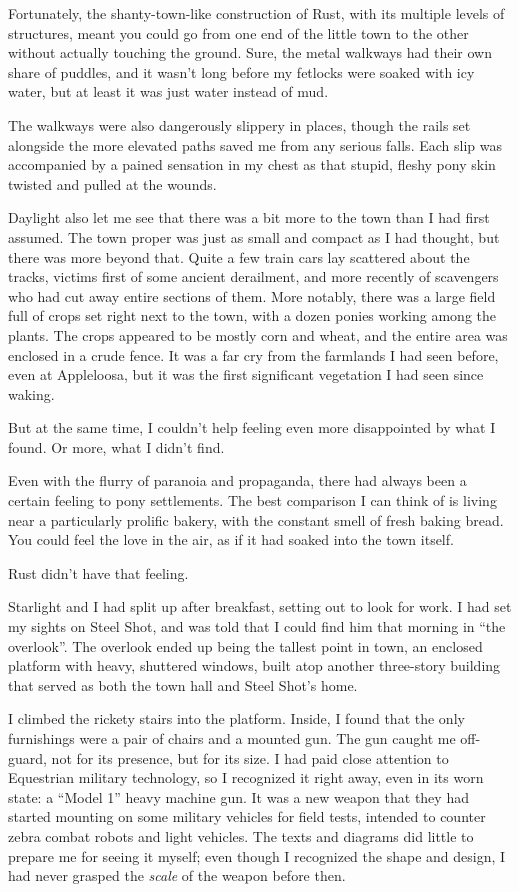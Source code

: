 Fortunately, the shanty-town-like construction of Rust, with its multiple levels of structures, meant you could go from one end of the little town to the other without actually touching the ground. Sure, the metal walkways had their own share of puddles, and it wasn’t long before my fetlocks were soaked with icy water, but at least it was just water instead of mud.

The walkways were also dangerously slippery in places, though the rails set alongside the more elevated paths saved me from any serious falls. Each slip was accompanied by a pained sensation in my chest as that stupid, fleshy pony skin twisted and pulled at the wounds.

Daylight also let me see that there was a bit more to the town than I had first assumed. The town proper was just as small and compact as I had thought, but there was more beyond that. Quite a few train cars lay scattered about the tracks, victims first of some ancient derailment, and more recently of scavengers who had cut away entire sections of them. More notably, there was a large field full of crops set right next to the town, with a dozen ponies working among the plants. The crops appeared to be mostly corn and wheat, and the entire area was enclosed in a crude fence. It was a far cry from the farmlands I had seen before, even at Appleloosa, but it was the first significant vegetation I had seen since waking.

But at the same time, I couldn’t help feeling even more disappointed by what I found. Or more, what I didn’t find.

Even with the flurry of paranoia and propaganda, there had always been a certain feeling to pony settlements. The best comparison I can think of is living near a particularly prolific bakery, with the constant smell of fresh baking bread. You could feel the love in the air, as if it had soaked into the town itself.

Rust didn’t have that feeling.

Starlight and I had split up after breakfast, setting out to look for work. I had set my sights on Steel Shot, and was told that I could find him that morning in “the overlook”. The overlook ended up being the tallest point in town, an enclosed platform with heavy, shuttered windows, built atop another three-story building that served as both the town hall and Steel Shot’s home.

I climbed the rickety stairs into the platform. Inside, I found that the only furnishings were a pair of chairs and a mounted gun. The gun caught me off-guard, not for its presence, but for its size. I had paid close attention to Equestrian military technology, so I recognized it right away, even in its worn state: a “Model 1” heavy machine gun. It was a new weapon that they had started mounting on some military vehicles for field tests, intended to counter zebra combat robots and light vehicles. The texts and diagrams did little to prepare me for seeing it myself; even though I recognized the shape and design, I had never grasped the \textit{scale} of the weapon before then.

